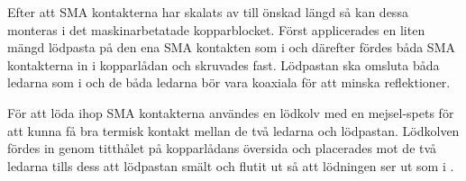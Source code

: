 \documentclass[main.tex]{subfiles}
\begin{document}
Efter att SMA kontakterna har skalats av till önskad längd så kan dessa monteras i det maskinarbetatade kopparblocket. Först applicerades en liten mängd lödpasta på den ena SMA kontakten som i  och därefter fördes båda SMA kontakterna in i kopparlådan och skruvades fast. Lödpastan ska omsluta båda ledarna som i  och de båda ledarna bör vara koaxiala för att minska reflektioner. 

För att löda ihop SMA kontakterna användes en lödkolv med en mejsel-spets för att kunna få bra termisk kontakt mellan de två ledarna och lödpastan. Lödkolven fördes in genom titthålet på kopparlådans översida och placerades mot de två ledarna tills dess att lödpastan smält och flutit ut så att lödningen ser ut som i .


\end{document}

